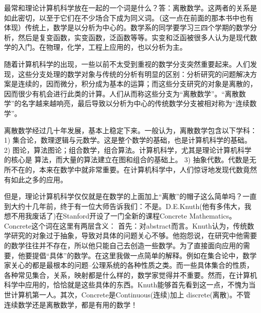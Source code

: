 最常和理论计算机科学放在一起的一个词是什么？答：离散数学。这两者的关系是如此密切，以至于它们在不少场合下成为同义词。（这一点在前面的那本书中也有体现）传统上，数学是以分析为中心的。数学系的同学要学习三四个学期的数学分析，然后是复变函数，实变函数，泛函数等等。实变和泛函被很多人认为是现代数学的入门。在物理，化学，工程上应用的，也以分析为主。

随着计算机科学的出现，一些以前不太受到重视的数学分支突然重要起来。人们发现，这些分支处理的数学对象与传统的分析有明显的区别：分析研究的问题解决方案是连续的，因而微分，积分成为基本的运算；而这些分支研究的对象是离散的，因而很少有机会进行此类的计算。人们从而称这些分支为“离散数学”。“离散数学”的名字越来越响亮，最后导致以分析为中心的传统数学分支被相对称为“连续数学”。

离散数学经过几十年发展，基本上稳定下来。一般认为，离散数学包含以下学科：
1) 集合论，数理逻辑与元数学。这是整个数学的基础，也是计算机科学的基础。
2) 图论，算法图论；组合数学，组合算法。计算机科学，尤其是理论计算机科学的核心是
算法，而大量的算法建立在图和组合的基础上。
3) 抽象代数。代数是无所不在的，本来在数学中就非常重要。在计算机科学中，人们惊讶地发现代数竟然有如此之多的应用。

但是，理论计算机科学仅仅就是在数学的上面加上“离散”的帽子这么简单吗？一直到大约十几年前，终于有一位大师告诉我们：不是。D.E.Knuth(他有多伟大，我想不用我废话了)在Stanford开设了一门全新的课程Concrete Mathematics。 Concrete这个词在这里有两层含义：
首先：对abstract而言。Knuth认为，传统数学研究的对象过于抽象，导致对具体的问题关心不够。他抱怨说，在研究中他需要的数学往往并不存在，所以他只能自己去创造一些数学。为了直接面向应用的需要，他要提倡“具体”的数学。在这里我做一点简单的解释。例如在集合论中，数学家关心的都是最根本的问题--公理系统的各种性质之类。而一些具体集合的性质，各种常见集合，关系，映射都是什么样的，数学家觉得并不重要。然而，在计算机科学中应用的，恰恰就是这些具体的东西。Knuth能够首先看到这一点，不愧为当世计算机第一人。其次，Concrete是Continuous(连续)加上 discrete(离散)。不管连续数学还是离散数学，都是有用的数学！

